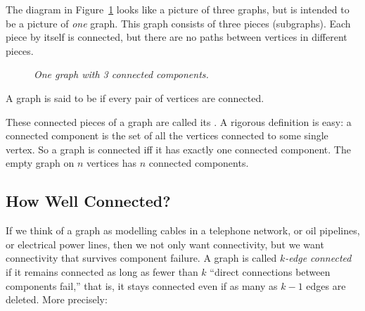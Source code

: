 The diagram in Figure~\ref{fig:3comp} looks like a picture of three
graphs, but is intended to be a picture of \emph{one} graph.  This graph
consists of three pieces (subgraphs).  Each piece by itself is connected,
but there are no paths between vertices in different pieces.

\begin{figure}[htbp] 
\caption{\em One graph with 3 connected components.}
\label{fig:3comp}
\end{figure}

\begin{definition}
A graph is said to be  if every pair of vertices are
connected.
\end{definition}
These connected pieces of a graph are called its .  A rigorous definition is easy: a connected component is the
set of all the vertices connected to some single vertex.  So a graph is
connected iff it has exactly one connected component.  The empty graph on
$n$ vertices has $n$ connected components.

\subsection{How Well Connected?}
If we think of a graph as modelling cables in a telephone network, or oil
pipelines, or electrical power lines, then we not only want connectivity,
but we want connectivity that survives component failure.  A graph is
called \emph{$k$-edge connected} if it remains connected as long as fewer
than $k$ ``direct connections between components fail,'' that is, it stays
connected even if as many as $k-1$ edges are deleted.  More precisely:

